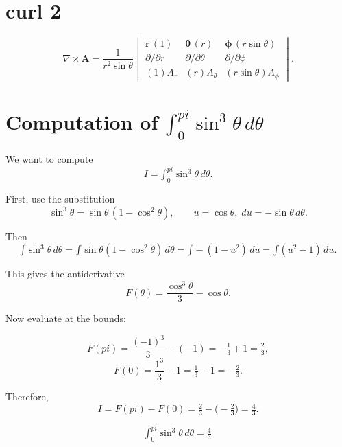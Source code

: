 \documentclass{article}
\def\pi{pi}%
\def\hat#1{#1}%
\def\dfrac#1#2{#1/#2}%
\def\int{\text{∫}}%
\begin{document}
\section*{curl 2}
\[
\nabla \times \mathbf{A}
= \frac{1}{r^2 \sin\theta}
\begin{vmatrix}
\hat{\mathbf r}\, (1) & \hat{\boldsymbol\theta}\, (r) & \hat{\boldsymbol\phi}\, (r\sin\theta) \\
\dfrac{\partial}{\partial r} & \dfrac{\partial}{\partial \theta} & \dfrac{\partial}{\partial \phi} \\
(1) A_r & (r) A_\theta & (r\sin\theta) A_\phi
\end{vmatrix}.
\]
\section{Computation of $\displaystyle \int_{0}^{\pi} \sin^{3}\theta \, d\theta$}

We want to compute
\[
I = \int_{0}^{\pi} \sin^{3}\theta \, d\theta.
\]

First, use the substitution
\[
\sin^{3}\theta = \sin\theta \,(1 - \cos^{2}\theta), \qquad u = \cos\theta, \; du = -\sin\theta\, d\theta.
\]

Then
\[
\int \sin^{3}\theta \, d\theta
= \int \sin\theta (1 - \cos^{2}\theta)\, d\theta
= \int -(1 - u^{2}) \, du
= \int (u^{2} - 1)\, du.
\]

This gives the antiderivative
\[
F(\theta) = \frac{\cos^{3}\theta}{3} - \cos\theta.
\]

Now evaluate at the bounds:

\[
F(\pi) = \frac{(-1)^{3}}{3} - (-1) = -\tfrac{1}{3} + 1 = \tfrac{2}{3},
\]
\[
F(0) = \frac{1^{3}}{3} - 1 = \tfrac{1}{3} - 1 = -\tfrac{2}{3}.
\]

Therefore,
\[
I = F(\pi) - F(0) = \tfrac{2}{3} - \Big(-\tfrac{2}{3}\Big) = \tfrac{4}{3}.
\]

\[
\boxed{\int_{0}^{\pi} \sin^{3}\theta \, d\theta = \tfrac{4}{3}}
\]
\end{document}
